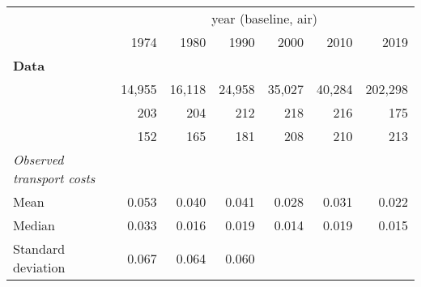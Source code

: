 \begin{tabular}{lllllll}
\cline{1-7}
\multicolumn{1}{c}{} &
  \multicolumn{6}{|c}{year (baseline, air)} \\
\multicolumn{1}{c}{} &
  \multicolumn{1}{|r}{1974} &
  \multicolumn{1}{r}{1980} &
  \multicolumn{1}{r}{1990} &
  \multicolumn{1}{r}{2000} &
  \multicolumn{1}{r}{2010} &
  \multicolumn{1}{r}{2019} \\
\cline{1-7}
\multicolumn{1}{l}{\textbf{Data}} &
  \multicolumn{1}{|r}{} &
  \multicolumn{1}{r}{} &
  \multicolumn{1}{r}{} &
  \multicolumn{1}{r}{} &
  \multicolumn{1}{r}{} &
  \multicolumn{1}{r}{} \\
\multicolumn{1}{l}{\hspace{1em}{$\#$ obs.}} &
  \multicolumn{1}{|r}{14,955} &
  \multicolumn{1}{r}{16,118} &
  \multicolumn{1}{r}{24,958} &
  \multicolumn{1}{r}{35,027} &
  \multicolumn{1}{r}{40,284} &
  \multicolumn{1}{r}{202,298} \\
\multicolumn{1}{l}{\hspace{1em}{$\#$ sectors}} &
  \multicolumn{1}{|r}{203} &
  \multicolumn{1}{r}{204} &
  \multicolumn{1}{r}{212} &
  \multicolumn{1}{r}{218} &
  \multicolumn{1}{r}{216} &
  \multicolumn{1}{r}{175} \\
\multicolumn{1}{l}{\hspace{1em}{$\#$ origin countries}} &
  \multicolumn{1}{|r}{152} &
  \multicolumn{1}{r}{165} &
  \multicolumn{1}{r}{181} &
  \multicolumn{1}{r}{208} &
  \multicolumn{1}{r}{210} &
  \multicolumn{1}{r}{213} \\
\multicolumn{1}{l}{{\textit{Observed transport costs}}} &
  \multicolumn{1}{|r}{} &
  \multicolumn{1}{r}{} &
  \multicolumn{1}{r}{} &
  \multicolumn{1}{r}{} &
  \multicolumn{1}{r}{} &
  \multicolumn{1}{r}{} \\
\multicolumn{1}{l}{\hspace{1em}Mean} &
  \multicolumn{1}{|r}{0.053} &
  \multicolumn{1}{r}{0.040} &
  \multicolumn{1}{r}{0.041} &
  \multicolumn{1}{r}{0.028} &
  \multicolumn{1}{r}{0.031} &
  \multicolumn{1}{r}{0.022} \\
\multicolumn{1}{l}{\hspace{1em}Median} &
  \multicolumn{1}{|r}{0.033} &
  \multicolumn{1}{r}{0.016} &
  \multicolumn{1}{r}{0.019} &
  \multicolumn{1}{r}{0.014} &
  \multicolumn{1}{r}{0.019} &
  \multicolumn{1}{r}{0.015} \\
\multicolumn{1}{l}{\hspace{1em}Standard deviation} &
  \multicolumn{1}{|r}{0.067} &
  \multicolumn{1}{r}{0.064} &
  \multicolumn{1}{r}{0.060} &

\end{tabular}
